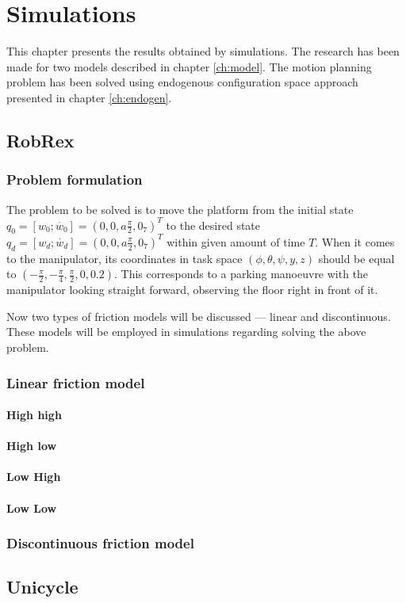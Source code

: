 \chapter{Simulations}
This chapter presents the results obtained by simulations. The research has been made for two models
described in chapter \ref{ch:model}. The motion planning problem has been solved using endogenous
configuration space approach presented in chapter \ref{ch:endogen}.
\section{RobRex}
\subsection{Problem formulation}
The problem to be solved is to move the platform from the initial state
$q_0 = [w_0; \dot{w_0}] = (0, 0, a\frac{\pi}{2}, 0_7)^T$ to the desired state
$q_d = [w_d; \dot{w_d}] = (0, 0, a\frac{\pi}{2}, 0_7)^T$
within given amount of time $T$. When it comes to the manipulator,
its coordinates in task space $(\phi, \theta, \psi, y, z) $ should be equal to
$(-\frac{\pi}{2}, -\frac{\pi}{4}, \frac{\pi}{2}, 0, 0.2)$.
This corresponds to a parking manoeuvre with the manipulator
looking straight forward, observing the floor right in front of it.

Now two types of friction models will be discussed --- linear
and discontinuous. These models will be employed in simulations
regarding solving the above problem.

\subsection{Linear friction model}
\subsubsection{High high}

\subsubsection{High low}

\subsubsection{Low High}

\subsubsection{Low Low}

\subsection{Discontinuous friction model}
\section{Unicycle}
